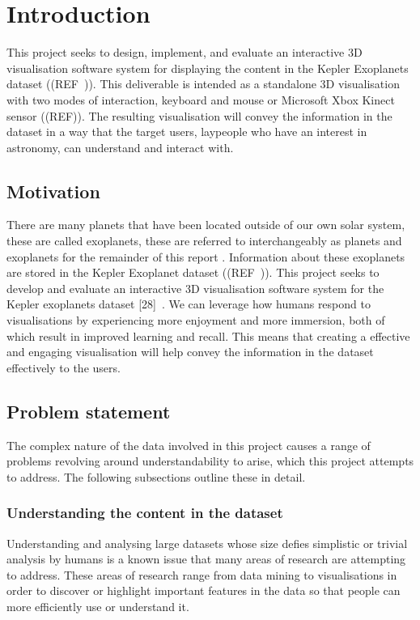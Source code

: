 \chapter{Introduction}\label{C:intro}
This project seeks to design, implement, and evaluate an interactive 3D visualisation software system for displaying the content in the Kepler Exoplanets dataset ((REF~)). This deliverable is intended as a standalone 3D visualisation with two modes of interaction, keyboard and mouse or Microsoft Xbox Kinect sensor ((REF)). The resulting visualisation will convey the information in the dataset in a way that the target users, laypeople who have an interest in astronomy, can understand and interact with.
\section{Motivation}
There are many planets that have been located outside of our own solar system, these are
called exoplanets, these are referred to interchangeably as planets and exoplanets for the remainder of this report
. Information about these exoplanets are stored in the Kepler Exoplanet dataset ((REF~)). This project seeks to develop and evaluate an interactive 3D visualisation
software system for the Kepler exoplanets dataset [28]~. We can leverage how humans respond to visualisations by experiencing more enjoyment and more immersion, both of which result in improved learning and recall. This means that creating a effective and engaging visualisation will help convey the information in the dataset effectively to the users.
\section{Problem statement}
The complex nature of the data involved in this project causes a range of problems revolving around understandability to arise, which this project attempts to address. The following subsections outline these in detail.

\subsection{Understanding the content in the dataset}
Understanding and analysing large datasets whose size defies simplistic or trivial analysis by humans is a known issue that many areas of research are attempting to address. These areas of research range from data mining to visualisations in order to discover or highlight important features in the data so that people can more efficiently use or understand it. 

